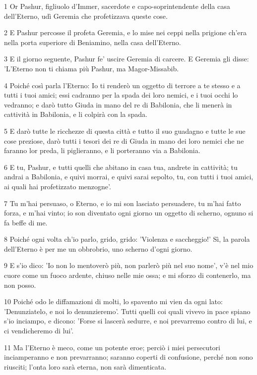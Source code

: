 \par 1 Or Pashur, figliuolo d'Immer, sacerdote e capo-soprintendente della casa dell'Eterno, udì Geremia che profetizzava queste cose.
\par 2 E Pashur percosse il profeta Geremia, e lo mise nei ceppi nella prigione ch'era nella porta superiore di Beniamino, nella casa dell'Eterno.
\par 3 E il giorno seguente, Pashur fe' uscire Geremia di carcere. E Geremia gli disse: 'L'Eterno non ti chiama più Pashur, ma Magor-Missabib.
\par 4 Poiché così parla l'Eterno: Io ti renderò un oggetto di terrore a te stesso e a tutti i tuoi amici; essi cadranno per la spada dei loro nemici, e i tuoi occhi lo vedranno; e darò tutto Giuda in mano del re di Babilonia, che li menerà in cattività in Babilonia, e li colpirà con la spada.
\par 5 E darò tutte le ricchezze di questa città e tutto il suo guadagno e tutte le sue cose preziose, darò tutti i tesori dei re di Giuda in mano dei loro nemici che ne faranno lor preda, li piglieranno, e li porteranno via a Babilonia.
\par 6 E tu, Pashur, e tutti quelli che abitano in casa tua, andrete in cattività; tu andrai a Babilonia, e quivi morrai, e quivi sarai sepolto, tu, con tutti i tuoi amici, ai quali hai profetizzato menzogne'.
\par 7 Tu m'hai persuaso, o Eterno, e io mi son lasciato persuadere, tu m'hai fatto forza, e m'hai vinto; io son diventato ogni giorno un oggetto di scherno, ognuno si fa beffe di me.
\par 8 Poiché ogni volta ch'io parlo, grido, grido: 'Violenza e saccheggio!' Sì, la parola dell'Eterno è per me un obbrobrio, uno scherno d'ogni giorno.
\par 9 E s'io dico: 'Io non lo mentoverò più, non parlerò più nel suo nome', v'è nel mio cuore come un fuoco ardente, chiuso nelle mie ossa; e mi sforzo di contenerlo, ma non posso.
\par 10 Poiché odo le diffamazioni di molti, lo spavento mi vien da ogni lato: 'Denunziatelo, e noi lo denunzieremo'. Tutti quelli coi quali vivevo in pace spiano s'io inciampo, e dicono: 'Forse si lascerà sedurre, e noi prevarremo contro di lui, e ci vendicheremo di lui'.
\par 11 Ma l'Eterno è meco, come un potente eroe; perciò i miei persecutori inciamperanno e non prevarranno; saranno coperti di confusione, perché non sono riusciti; l'onta loro sarà eterna, non sarà dimenticata.
